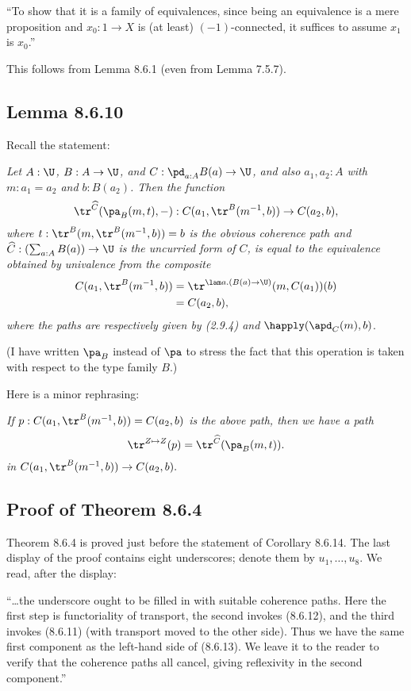 \documentclass[12pt]{article}
\begin{document}
\nn``To show that it is a family of equivalences, since being an equivalence is a mere proposition and $x_0:1\to X$ is (at least) $(-1)$-connected, it suffices to assume $x_1$ is $x_0$.''

\nn This follows from Lemma 8.6.1 (even from Lemma 7.5.7).


\subsection{Lemma 8.6.10}%

Recall the statement:

\nn{} \emph{Let $A:\U$, $B:A\to \U$, and $C:\pd_{a:A} B(a)\to\U$, and also $a_1,a_2:A$ with $m:a_1=a_2$ and $b:B(a_2)$. Then the function
$$
\tr^{\widehat C}(\pa_B(m,t),-):C(a_1,\tr^B(m^{-1},b))\to C(a_2,b),
$$ 
where $t:\tr^B(m,\tr^B(m^{-1},b))=b$ is the obvious coherence path and $\widehat C:(\sum_{a:A}B(a))\to\U$ is the uncurried form of $C$, is equal to the equivalence obtained by univalence from the composite 
\begin{align*}
C(a_1,\tr^B(m^{-1},b))
&=\tr^{\lam a.(B(a)\to\U)}(m,C(a_1))(b)\\
&=C(a_2,b),
\end{align*} 
where the paths are respectively given by (2.9.4) and} $\happly(\apd_C(m),b)$. 

(I have written $\pa_B$ instead of $\pa$ to stress the fact that this operation is taken with respect to the type family $B$.)

Here is a minor rephrasing: 

\nn\emph{If $p:C(a_1,\tr^B(m^{-1},b))=C(a_2,b)$ is the above path, then we have a path
$$
\tr^{Z\mapsto Z}(p)=\tr^{\widehat C}(\pa_B(m,t)).
$$ 
in} $
C(a_1,\tr^B(m^{-1},b))\to C(a_2,b).$


\subsection{Proof of Theorem 8.6.4}%

Theorem 8.6.4 is proved just before the statement of Corollary 8.6.14. The last display of the proof contains eight underscores; denote them by $u_1,\dots,u_8$. We read, after the display:

\nn``\dots the underscore ought to be filled in with suitable coherence paths. Here the first step is functoriality of transport, the second invokes (8.6.12), and the third invokes (8.6.11) (with transport moved to the other side). Thus we have the same first component as the left-hand side of (8.6.13). We leave it to the reader to verify that the coherence paths all cancel, giving reflexivity in the second component.''
\end{document}
